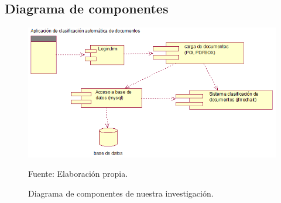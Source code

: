 \subsection{Diagrama de componentes}
\begin{figure}[h!]
	\centering
		\includegraphics[scale=0.7]{imagenes/diagramadeComponentes2.png}
		\caption{Diagrama de componentes de nuestra investigación.}
	\begin{center}
    Fuente: Elaboración propia.
    \end{center}
	\label{fig:diagramadecomponentes}
\end{figure}
\newpage
